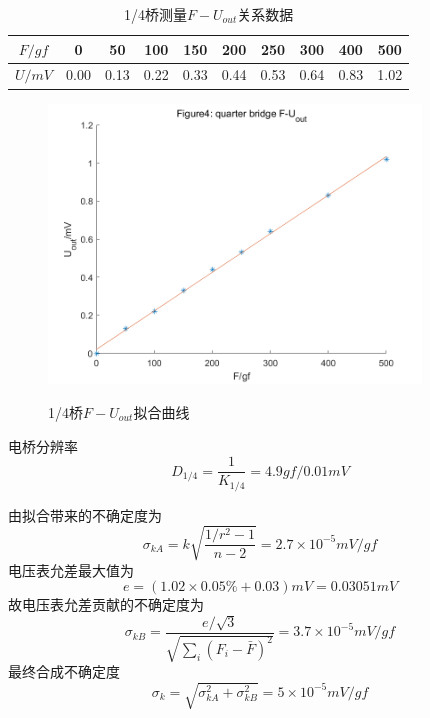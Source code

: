 \documentclass[12pt, a4paper]{ctexart}
\begin{document}
\begin{table}[htbp]
    \centering
    \begin{tabular}{cccccccccc}
        \toprule
        $F/gf$ & 0 & 50 & 100 & 150 & 200 & 250 & 300 & 400 & 500 \\
        \midrule
        $U/mV$ & 0.00 & 0.13 & 0.22 & 0.33 & 0.44 & 0.53 & 0.64 & 0.83 & 1.02 \\
        \bottomrule
    \end{tabular}
    \caption{1/4桥测量$F-U_{out}$关系数据}
    \label{t6}
\end{table}
\begin{figure}[htbp]
    \centering
    \caption{1/4桥$F-U_{out}$拟合曲线}
    \includegraphics[width=3.9in]{figure/quarter bridge F-U_out figure.png}
    \label{fig5}
\end{figure}
电桥分辨率
\begin{equation*}
    D_{1/4} = \frac{1}{K_{1/4}} = 4.9gf/0.01mV
\end{equation*}

由拟合带来的不确定度为
\begin{equation*}
    \sigma_{kA} = k\sqrt{\frac{1/r^2 - 1}{n - 2}} = 2.7\times 10^{-5}mV/gf
\end{equation*}
电压表允差最大值为
\begin{equation*}
    e = (1.02 \times 0.05\% + 0.03) mV = 0.03051mV
\end{equation*}
故电压表允差贡献的不确定度为
\begin{equation*}
    \sigma_{kB} = \frac{e/\sqrt{3}}{\sqrt{\sum_i (F_i - \bar{F})^2}} = 3.7 \times 10^{-5}mV/gf
\end{equation*}
最终合成不确定度
\begin{equation*}
    \sigma_k = \sqrt{\sigma_{kA}^2 + \sigma_{kB}^2} = 5 \times 10^{-5} mV/gf
\end{equation*}
\end{document}
